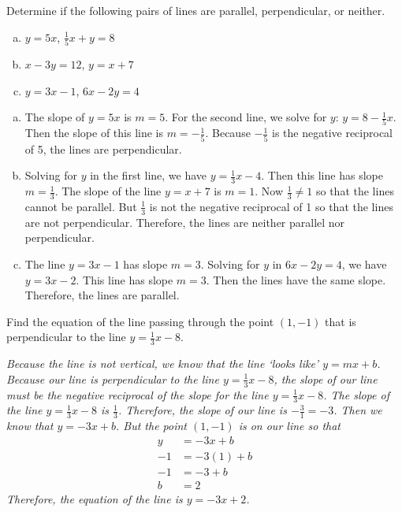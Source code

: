 \documentclass[11pt,letterpaper]{article}
\begin{document}
 Determine if the following pairs of lines are parallel, perpendicular, or neither.
	\begin{enumerate}[(a)]
	\item $y= 5x$, \enskip $\frac{1}{5}x + y= 8$
	\item $x - 3y= 12$, \enskip $y= x + 7$
	\item $y= 3x - 1$, \enskip $6x - 2y= 4$
	\end{enumerate} \pspace

\sol
{\itshape
\begin{enumerate}[(a)]
\item The slope of $y= 5x$ is $m= 5$. For the second line, we solve for $y$: $y= 8 - \frac{1}{5} x$. Then the slope of this line is $m= -\frac{1}{5}$. Because $-\frac{1}{5}$ is the negative reciprocal of 5, the lines are perpendicular. \pspace


\item Solving for $y$ in the first line, we have $y= \frac{1}{3}x - 4$. Then this line has slope $m= \frac{1}{3}$. The slope of the line $y= x + 7$ is $m= 1$. Now $\frac{1}{3} \neq 1$ so that the lines cannot be parallel. But $\frac{1}{3}$ is not the negative reciprocal of 1 so that the lines are not perpendicular. Therefore, the lines are neither parallel nor perpendicular. \pspace


\item The line $y= 3x - 1$ has slope $m= 3$. Solving for $y$ in $6x - 2y= 4$, we have $y= 3x - 2$. This line has slope $m= 3$. Then the lines have the same slope. Therefore, the lines are parallel. 
\end{enumerate}
}





\newpage





 Find the equation of the line passing through the point $(1, -1)$ that is perpendicular to the line $y= \frac{1}{3} x - 8$. \pvspace{1.1cm}

\sol
{\itshape
Because the line is not vertical, we know that the line `looks like' $y= mx + b$. Because our line is perpendicular to the line $y= \frac{1}{3}x - 8$, the slope of our line must be the negative reciprocal of the slope for the line $y= \frac{1}{3}x - 8$. The slope of the line $y= \frac{1}{3}x - 8$ is $\frac{1}{3}$. Therefore, the slope of our line is $-\frac{3}{1}= -3$. Then we know that $y= -3x + b$. But the point $(1, -1)$ is on our line so that
	\[
	\begin{aligned}
	y&= -3x + b \\
	-1&= -3(1) + b \\
	-1&= -3 + b \\
	b&= 2
	\end{aligned}
	\]
Therefore, the equation of the line is $y= -3x + 2$. 
}
\end{document}
